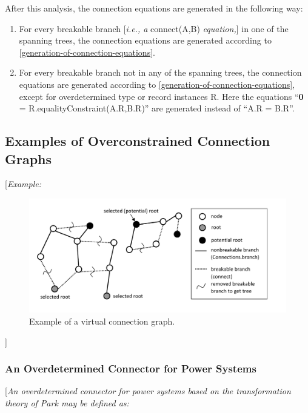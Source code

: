 \documentclass[10pt,a4paper]{report}
\def\doublelabel#1{\label{#1}}
\renewcommand{\labelenumi}{\arabic{enumi}.}
\begin{document}
After this analysis, the connection equations are generated in the
following way:

\begin{enumerate}
\def\labelenumi{\arabic{enumi}.}
\item
  For every breakable branch {[}\emph{i.e., a} connect(A,B)
  \emph{equation,}{]} in one of the spanning trees, the connection
  equations are generated according to \ref{generation-of-connection-equations}.
\item
  For every breakable branch not in any of the spanning trees, the
  connection equations are generated according to \ref{generation-of-connection-equations}, except
  for overdetermined type or record instances R. Here the equations
  ``\textbf{0} = R.equalityConstraint(A.R,B.R)'' are generated instead
  of ``A.R = B.R''.
\end{enumerate}

\subsection{Examples of Overconstrained Connection Graphs}\doublelabel{examples-of-overconstrained-connection-graphs}

{[}\emph{Example:}

\begin{figure}[H]
\caption{Example of a virtual connection graph.}
\includegraphics{media/overdetermined}
\end{figure}

{]}

\subsubsection{An Overdetermined Connector for Power Systems}\doublelabel{an-overdetermined-connector-for-power-systems}

{[}\emph{An overdetermined connector for power systems based on the
transformation theory of Park may be defined as:}
\end{document}

